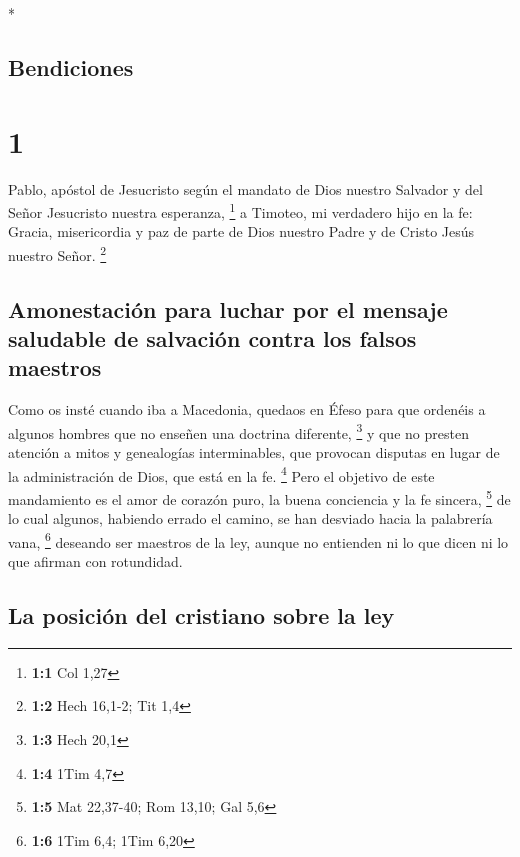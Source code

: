 \begin{paracol}{2} \switchcolumn[0]*

\hypertarget{bendiciones}{%
\subsection{Bendiciones}\label{bendiciones}}

\hypertarget{section}{%
\section{1}\label{section}}

 Pablo, apóstol de Jesucristo según el mandato de Dios
nuestro Salvador y del Señor Jesucristo nuestra esperanza, \footnote{\textbf{1:1}
  Col 1,27}  a Timoteo, mi verdadero hijo en la fe:
Gracia, misericordia y paz de parte de Dios nuestro Padre y de Cristo
Jesús nuestro Señor. \footnote{\textbf{1:2} Hech 16,1-2; Tit 1,4}

\hypertarget{amonestaciuxf3n-para-luchar-por-el-mensaje-saludable-de-salvaciuxf3n-contra-los-falsos-maestros}{%
\subsection{Amonestación para luchar por el mensaje saludable de
salvación contra los falsos
maestros}\label{amonestaciuxf3n-para-luchar-por-el-mensaje-saludable-de-salvaciuxf3n-contra-los-falsos-maestros}}

 Como os insté cuando iba a Macedonia, quedaos en Éfeso
para que ordenéis a algunos hombres que no enseñen una doctrina
diferente, \footnote{\textbf{1:3} Hech 20,1}  y que no
presten atención a mitos y genealogías interminables, que provocan
disputas en lugar de la administración de Dios, que está en la fe.
\footnote{\textbf{1:4} 1Tim 4,7}  Pero el objetivo de este
mandamiento es el amor de corazón puro, la buena conciencia y la fe
sincera, \footnote{\textbf{1:5} Mat 22,37-40; Rom 13,10; Gal 5,6}
 de lo cual algunos, habiendo errado el camino, se han
desviado hacia la palabrería vana, \footnote{\textbf{1:6} 1Tim 6,4; 1Tim
  6,20}  deseando ser maestros de la ley, aunque no
entienden ni lo que dicen ni lo que afirman con rotundidad.

\hypertarget{la-posiciuxf3n-del-cristiano-sobre-la-ley}{%
\subsection{La posición del cristiano sobre la
ley}\label{la-posiciuxf3n-del-cristiano-sobre-la-ley}}


\end{paracol}

